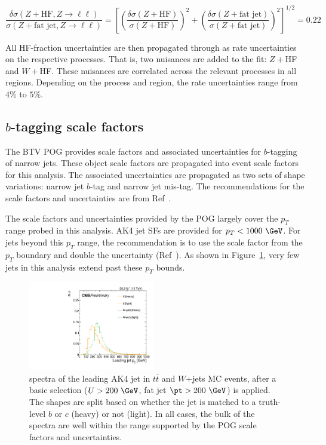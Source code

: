 \begin{equation}
  \frac{\delta\sigma(Z+\text{HF}, Z\rightarrow \ell\ell)}{\sigma(Z+\text{fat jet}, Z\rightarrow \ell\ell)}  = \left[ \left(\frac{\delta\sigma(Z+\text{HF})}{\sigma(Z+\text{HF})}\right)^2 +  \left(\frac{\delta\sigma(Z+\text{fat jet})}{\sigma(Z+\text{fat jet})}\right)^2 \right]^{1/2} = 0.22
\end{equation}

All HF-fraction uncertainties are then propagated through as rate uncertainties on the respective processes. 
That is, two nuisances are added to the fit: $Z+$HF and $W+$HF.
These nuisances are correlated across the relevant processes in all regions.
Depending on the process and region, the rate uncertainties range from $4\%$ to $5\%$. 


\subsection{$b$-tagging scale factors}\label{sec:btagsfs}

The BTV POG provides scale factors and associated uncertainties for $b$-tagging of narrow jets. 
These object scale factors are propagated into event scale factors for this analysis. 
The associated uncertainties are propagated as two sets of shape variations: narrow jet $b$-tag and narrow jet mis-tag.
The recommendations for the scale factors and uncertainties are from Ref~\cite{TWIKI-BTAG}.

The scale factors and uncertainties provided by the POG largely cover the $p_T$ range probed in this analysis. AK4 jet SFs are provided for $p_T<1000~\GeV$. For jets beyond this $p_T$ range, the recommendation is to use the scale factor from the $p_T$ boundary and double the uncertainty (Ref~\cite{TWIKI-BTAG}). As shown in Figure~\ref{fig:bjetspectra}, very few jets in this analysis extend past these $p_T$ bounds.

\begin{figure}[htbp]
  \centering
  \includegraphics[width=0.49\textwidth]{figures/btag_eff/jet1Pt.pdf}
  \caption{\pt spectra of the leading AK4 jet in $t\bar{t}$ and $W$+jets MC events, after a basic selection ($U>200~\GeV$, fat jet $\pt>200~\GeV$) is applied.
  The shapes are split based on whether the jet is matched to a truth-level $b$ or $c$ (heavy) or not (light).
  In all cases, the bulk of the spectra are well within the range supported by the POG scale factors and uncertainties. }
  \label{fig:bjetspectra}
\end{figure}

